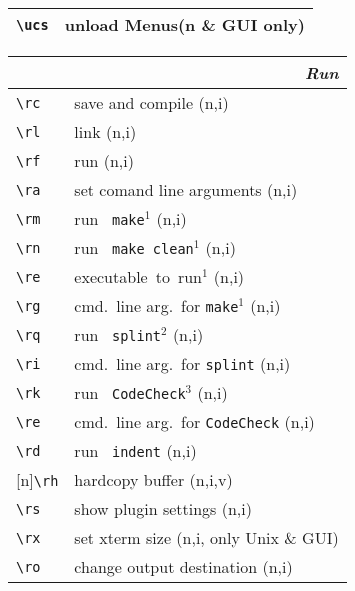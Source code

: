 \documentclass[oneside,11pt,landscape,DIV16]{scrartcl}
\newcommand{\Rep}{{\tiny{[n]}}}
\begin{document}
\begin{multicols}{3}
\begin{center}
\begin{tabular}[]{|p{12mm}|p{60mm}|}
\hline \verb'\ucs'  & unload  Menus\hfill \scriptsize{(n \& GUI only)}\\
\hline 
\end{tabular}
\vspace{100mm}
\begin{tabular}[]{|p{12mm}|p{58mm}|}
\hline
\multicolumn{2}{|r|}{\textsl{\textbf{R}un}} \\
\hline \verb'\rc'  & save and compile                        \hfill (n,i)\\
\hline \verb'\rl'  & link                                    \hfill (n,i)\\
\hline \verb'\rf'  & run                                     \hfill (n,i)\\
\hline \verb'\ra'  & set comand line arguments               \hfill (n,i)\\
\hline \verb'\rm'  & run \texttt{ make}$^1$                      \hfill (n,i)\\
\hline \verb'\rn' & run \texttt{ make clean}$^1$                \hfill (n,i)\\
\hline \verb'\re' & executable\ to\ run$^1$                     \hfill (n,i)\\
\hline \verb'\rg' & cmd.\ line arg.\ for \texttt{make}$^1$      \hfill (n,i)\\
%
\hline \verb'\rq'  & run \texttt{ splint}$^2$     \hfill (n,i)\\
\hline \verb'\ri' & cmd.\ line arg.\ for \texttt{splint}    \hfill (n,i)\\
%
\hline \verb'\rk'  & run \texttt{ CodeCheck}$^3$  \hfill (n,i)\\
\hline \verb'\re' & cmd.\ line arg.\ for \texttt{CodeCheck} \hfill (n,i)\\
%
\hline \verb'\rd'  & run \texttt{ indent}         \hfill (n,i)\\
\hline \Rep\verb'\rh'  & hardcopy buffer             \hfill (n,i,v)\\
\hline \verb'\rs'  & show plugin settings        \hfill (n,i)\\
\hline \verb'\rx'  & set xterm size              \hfill (n,i, only Unix \& GUI)\\
\hline \verb'\ro'  & change output destination   \hfill (n,i)\\
\hline

\end{tabular}
\end{center}
\end{multicols}
\end{document}
